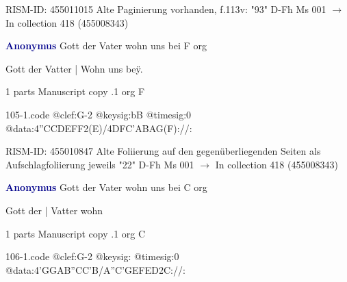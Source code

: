 \documentclass[twocolumn]{book}
\begin{document}
\newline RISM-ID: 455011015
\newline Alte Paginierung vorhanden, f.113v: "93"
\newline D-Fh  Ms 001
\newline $\rightarrow$ In collection 418 (455008343)

\newline \par \vspace{7pt} \textcolor{darkblue}{\textbf{Anonymus  }}
\newline Gott der Vater wohn uns bei  F  
\newline org
\newline \begin{itshape}[f.21v, at left:] Gott der Vatter | Wohn uns beÿ.\end{itshape} 
\newline \textcolor{darkblue}{}  1 parts  
\newline Manuscript copy
.1  org  F  
\begin{filecontents*}{105-1.code}
@clef:G-2
@keysig:bB
@timesig:0
@data:4''CCDEFF2(E)/4DFC'ABAG(F)://:
\end{filecontents*}
\newline
%

\newline RISM-ID: 455010847
\newline Alte Foliierung auf den gegenüberliegenden Seiten als Aufschlagfoliierung jeweils "22"
\newline D-Fh  Ms 001
\newline $\rightarrow$ In collection 418 (455008343)

\newline \par \vspace{7pt} \textcolor{darkblue}{\textbf{Anonymus  }}
\newline Gott der Vater wohn uns bei  C  
\newline org
\newline \begin{itshape}[f.41v, at left:] Gott der | Vatter wohn\end{itshape} 
\newline \textcolor{darkblue}{}  1 parts  
\newline Manuscript copy
.1  org  C  
\begin{filecontents*}{106-1.code}
@clef:G-2
@keysig:
@timesig:0
@data:4'GGAB''CC'B/A''C'GEFED2C://:
\end{filecontents*}
\newline
%
\end{document}
